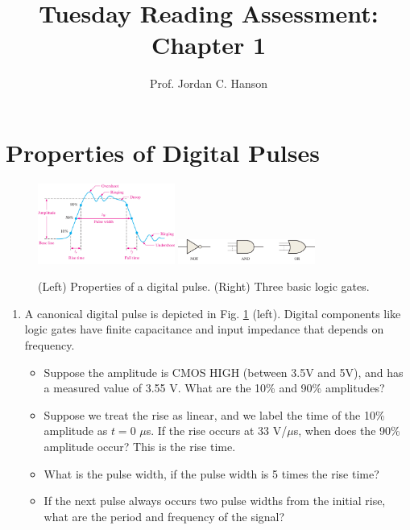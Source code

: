\documentclass{article}
\begin{document}
\title{Tuesday Reading Assessment: Chapter 1}
\author{Prof. Jordan C. Hanson}

\maketitle

\section{Properties of Digital Pulses}

\begin{figure}
\centering
\includegraphics[width=0.4\textwidth]{figures/pulse2.jpg} \hspace{1cm}
\includegraphics[width=0.4\textwidth]{figures/gate_0.jpg}
\caption{\label{fig:p} (Left) Properties of a digital pulse. (Right) Three basic logic gates.}
\end{figure}

\begin{enumerate}
\item A canonical digital pulse is depicted in Fig. \ref{fig:p} (left).  Digital components like logic gates have finite capacitance and input impedance that depends on frequency.
\begin{itemize}
\item Suppose the amplitude is CMOS HIGH (between 3.5V and 5V), and has a measured value of 3.55 V.  What are the 10\% and 90\% amplitudes? \\ \vspace{0.5cm}
\item Suppose we treat the rise as linear, and we label the time of the 10\% amplitude as $t=0$ $\mu$s.  If the rise occurs at 33 V/$\mu$s, when does the 90\% amplitude occur?  This is the rise time. \\ \vspace{0.5cm}
\item What is the pulse width, if the pulse width is 5 times the rise time? \\ \vspace{0.5cm}
\item If the next pulse always occurs two pulse widths from the initial rise, what are the period and frequency of the signal? \\ \vspace{0.5cm}
\end{itemize}
\end{enumerate}
\end{document}
